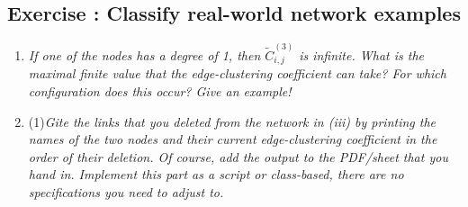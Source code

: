 \documentclass[10pt,a4paper]{article}
\newcommand{\exercise}[1]
{
  \stepcounter{subsection}
  \subsection*{Exercise \thesubsection: #1}

}
\begin{document}
\newpage
\exercise{Classify real-world network examples}
\begin{enumerate}
	\item \textit{If one of the nodes has a degree of 1, then $\tilde{C}_{i,j}^{(3)} $ is infinite. What is the maximal finite value
		that the edge-clustering coefficient can take? For which configuration does this occur? Give
		an example!}
	
	
	
	
	\item (1)\textit{Gite the links that you deleted from the network in (iii) by printing the names of the
		two nodes and their current edge-clustering coefficient in the order of their deletion. Of
		course, add the output to the PDF/sheet that you hand in. Implement this part as a
		script or class-based, there are no specifications you need to adjust to.}
	

\end{enumerate}
\end{document}
